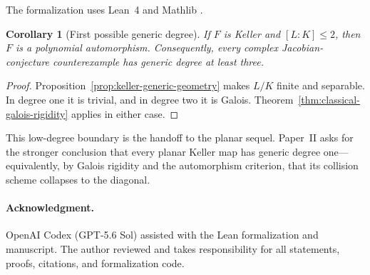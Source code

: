 \documentclass[11pt]{article}
\newtheorem{corollary}[theorem]{Corollary}
\theoremstyle{remark}
\begin{document}
The formalization uses Lean~4 and Mathlib \cite{Lean4,Mathlib}.

\begin{corollary}[First possible generic degree]
\label{cor:first-possible-generic-degree}
If \(F\) is Keller and \([L:K]\leq2\), then \(F\) is a polynomial
automorphism.  Consequently, every complex Jacobian-conjecture counterexample
has generic degree at least three.
\end{corollary}

\begin{proof}
Proposition~\ref{prop:keller-generic-geometry} makes \(L/K\) finite and
separable.  In degree one it is trivial, and in degree two it is Galois.
Theorem~\ref{thm:classical-galois-rigidity} applies in either case.
\end{proof}

This low-degree boundary is the handoff to the planar sequel.  Paper~II asks
for the stronger conclusion that every planar Keller map has generic degree
one---equivalently, by Galois rigidity and the automorphism criterion, that
its collision scheme collapses to the diagonal.

\paragraph{Acknowledgment.}
OpenAI Codex (GPT-5.6 Sol) assisted with the Lean formalization and
manuscript.  The
author reviewed and takes responsibility for all statements, proofs,
citations, and formalization code.

\begingroup
\small


\endgroup
\end{document}
